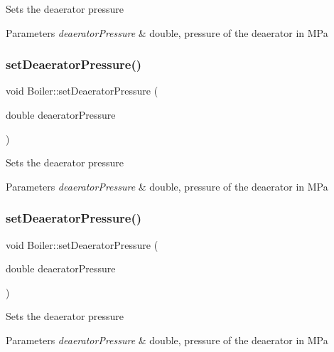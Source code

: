 Sets the deaerator pressure 
\begin{DoxyParams}{Parameters}
{\em deaerator\+Pressure} & double, pressure of the deaerator in M\+Pa \\
\hline
\end{DoxyParams}
\mbox{\label{class_boiler_a56f422254606ebba1248ae0b4f8f0215}} 
\subsubsection{\texorpdfstring{set\+Deaerator\+Pressure()}{setDeaeratorPressure()}\hspace{0.1cm}{\footnotesize\ttfamily [2/3]}}
{\footnotesize\ttfamily void Boiler\+::set\+Deaerator\+Pressure (\begin{DoxyParamCaption}\item[{double}]{deaerator\+Pressure }\end{DoxyParamCaption})}

Sets the deaerator pressure 
\begin{DoxyParams}{Parameters}
{\em deaerator\+Pressure} & double, pressure of the deaerator in M\+Pa \\
\hline
\end{DoxyParams}
\mbox{\label{class_boiler_a56f422254606ebba1248ae0b4f8f0215}} 
\subsubsection{\texorpdfstring{set\+Deaerator\+Pressure()}{setDeaeratorPressure()}\hspace{0.1cm}{\footnotesize\ttfamily [3/3]}}
{\footnotesize\ttfamily void Boiler\+::set\+Deaerator\+Pressure (\begin{DoxyParamCaption}\item[{double}]{deaerator\+Pressure }\end{DoxyParamCaption})}

Sets the deaerator pressure 
\begin{DoxyParams}{Parameters}
{\em deaerator\+Pressure} & double, pressure of the deaerator in M\+Pa \\
\hline
\end{DoxyParams}


